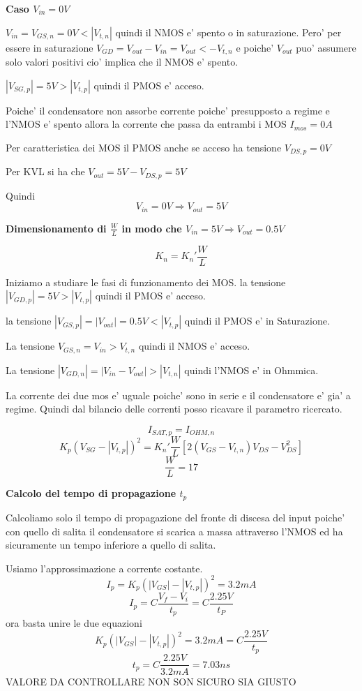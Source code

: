 \documentclass[\main/main.tex]{subfiles}
\begin{document}
\textbf{Caso $V_{in} = 0V$}

$V_{in} = V_{GS,n} = 0V < |V_{t,n}|$ quindi il NMOS e' spento o in saturazione.
Pero' per essere in saturazione $V_{GD} = V_{out} - V_{in} = V_{out} < -V_{t,n}$
e poiche' $V_{out}$ puo' assumere solo valori positivi cio' implica che il NMOS e' spento.

$|V_{SG,p}| = 5V > |V_{t,p}|$ quindi il PMOS e' acceso.

Poiche' il condensatore non assorbe corrente poiche' presupposto a regime e l'NMOS e' spento allora la corrente che passa da entrambi i MOS $I_{mos} = 0A$

Per caratteristica dei MOS il PMOS anche se acceso ha tensione $V_{DS,p} = 0V$

Per KVL si ha che $V_{out} = 5V - V_{DS,p} = 5V$

Quindi \[ V_{in} = 0V \Rightarrow V_{out} = 5V\]

\textbf{Dimensionamento di $\frac{W}{L}$ in modo che $V_{in} = 5V \Rightarrow V_{out} = 0.5V$}

\[ K_n = K_n' \frac{W}{L} \]

Iniziamo a studiare le fasi di funzionamento dei MOS.
la tensione $|V_{GD,p}| = 5V > |V_{t,p}|$ quindi il PMOS e' acceso.

la tensione $|V_{GS,p}| = |V_{out}| = 0.5V < |V_{t,p}|$ quindi il PMOS e' in Saturazione.

La tensione $V_{GS,n} = V_{in} > V_{t,n}$ quindi il NMOS e' acceso.

La tensione $|V_{GD,n}| = |V_{in} - V_{out}| > |V_{t,n}|$ quindi l'NMOS e' in Ohmmica.

La corrente dei due mos e' uguale poiche' sono in serie e il condensatore e' gia' a regime.
Quindi dal bilancio delle correnti posso ricavare il parametro ricercato.

\[I_{SAT,p} = I_{OHM,n}\]
\[K_p \left(V_{SG} - |V_{t,p}| \right)^2 = K_n' \frac{W}{L} \left[ 2 \left( V_{GS} - V_{t,n} \right) V_{DS} - V_{DS}^2 \right]\]
\[\frac{W}{L} = 17\]

\textbf{Calcolo del tempo di propagazione $t_p$}

Calcoliamo solo il tempo di propagazione del fronte di discesa del input poiche' con quello di salita il condensatore si scarica a massa attraverso l'NMOS ed ha sicuramente un tempo inferiore a quello di salita.

Usiamo l'approssimazione a corrente costante.
\[I_p = K_p \left(|V_{GS}| - |V_{t,p}| \right)^2 = 3.2mA\]
\[I_p = C \frac{V_f - V_i}{t_p} = C \frac{2.25V}{t_P}\]
ora basta unire le due equazioni
\[ K_p \left(|V_{GS}| - |V_{t,p}| \right)^2 = 3.2mA = C \frac{2.25V}{t_p}\]
\[t_p = C \frac{2.25V}{3.2mA} = 7.03ns\]
VALORE DA CONTROLLARE NON SON SICURO SIA GIUSTO
\end{document}
